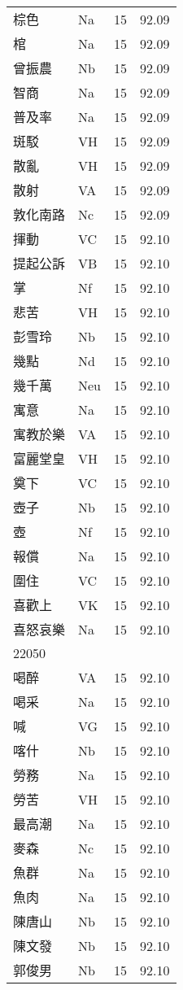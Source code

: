 \documentclass[twocolumn]{book}
\begin{document}
\begin{supertabular}{llrr}
棕色 & Na & 15 &  92.09\\
棺 & Na & 15 &  92.09\\
曾振農 & Nb & 15 &  92.09\\
智商 & Na & 15 &  92.09\\
普及率 & Na & 15 &  92.09\\
斑駁 & VH & 15 &  92.09\\
散亂 & VH & 15 &  92.09\\
散射 & VA & 15 &  92.09\\
敦化南路 & Nc & 15 &  92.09\\
揮動 & VC & 15 &  92.10\\
提起公訴 & VB & 15 &  92.10\\
掌 & Nf & 15 &  92.10\\
悲苦 & VH & 15 &  92.10\\
彭雪玲 & Nb & 15 &  92.10\\
幾點 & Nd & 15 &  92.10\\
幾千萬 & Neu & 15 &  92.10\\
寓意 & Na & 15 &  92.10\\
寓教於樂 & VA & 15 &  92.10\\
富麗堂皇 & VH & 15 &  92.10\\
奠下 & VC & 15 &  92.10\\
壺子 & Nb & 15 &  92.10\\
壺 & Nf & 15 &  92.10\\
報償 & Na & 15 &  92.10\\
圍住 & VC & 15 &  92.10\\
喜歡上 & VK & 15 &  92.10\\
喜怒哀樂 & Na & 15 &  92.10\\
22050\\
喝醉 & VA & 15 &  92.10\\
喝采 & Na & 15 &  92.10\\
喊 & VG & 15 &  92.10\\
喀什 & Nb & 15 &  92.10\\
勞務 & Na & 15 &  92.10\\
勞苦 & VH & 15 &  92.10\\
最高潮 & Na & 15 &  92.10\\
麥森 & Nc & 15 &  92.10\\
魚群 & Na & 15 &  92.10\\
魚肉 & Na & 15 &  92.10\\
陳唐山 & Nb & 15 &  92.10\\
陳文發 & Nb & 15 &  92.10\\
郭俊男 & Nb & 15 &  92.10\\

\end{supertabular}
\end{document}
